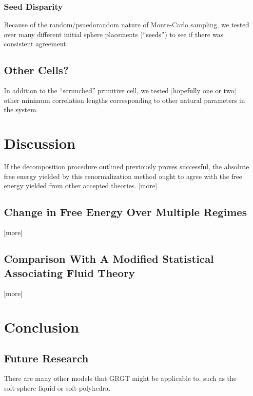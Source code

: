 \documentclass[12pt]{article}
\begin{document}
\subsubsection{Seed Disparity}
Because of the random/psuedorandom nature of Monte-Carlo sampling, we tested over many different initial sphere placements (``seeds'') to see if there was consistent agreement. 
\subsection{Other Cells?}
In addition to the ``scrunched'' primitive cell, we tested [hopefully one or two] other minimum correlation lengths corresponding to other natural parameters in the system.


\section{Discussion}
If the decomposition procedure outlined previously proves successful, the absolute free energy yielded by this renormalization method ought to agree with the free energy yielded from other accepted theories. [more]
\subsection{Change in Free Energy Over Multiple Regimes}
[more]
\subsection{Comparison With A Modified Statistical Associating Fluid Theory}
[more]



\section{Conclusion}


\subsection{Future Research}
There are many other models that GRGT might be applicable to, such as the soft-sphere liquid or soft polyhedra.
%

\end{document}

